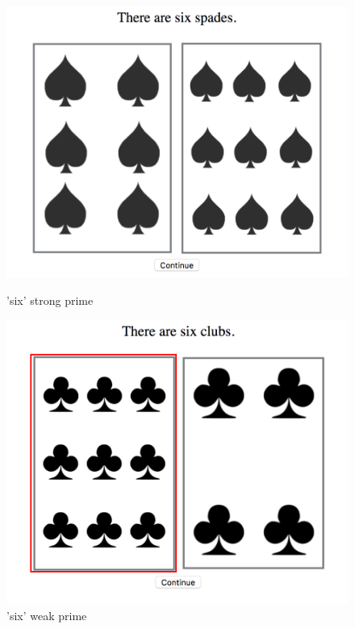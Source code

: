 \documentclass[]{article}
\begin{document}
\begin{figure}[h]
\centering
\begin{minipage}[b]{0.3\textwidth}
\includegraphics[width=\textwidth]{six_strong.png} 
\caption{'six' strong prime}
\end{minipage}
\begin{minipage}[b]{0.3\textwidth}

\includegraphics[width=\textwidth]{six_weak.png} 
\caption{'six' weak prime}
\end{minipage}
\begin{minipage}[b]{0.3\textwidth}


\end{minipage}
\end{figure}
\end{document}
